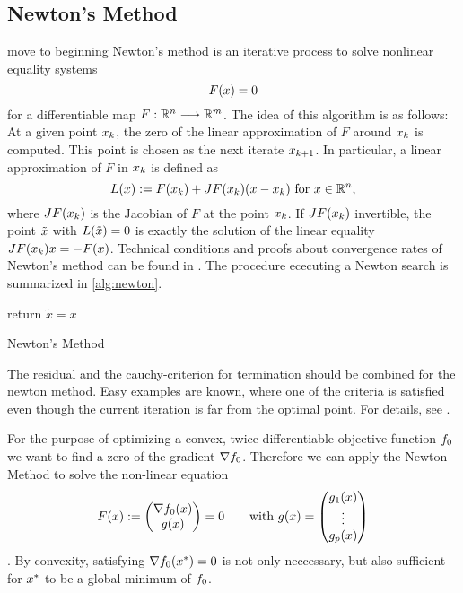 \subsection{Newton's Method}
\todo move to beginning
Newton's method is an iterative process to solve nonlinear equality systems
\begin{equation}
F(x)= 0
\end{equation}
for a differentiable map $ F: \mathbb{R}^n \longrightarrow \mathbb{R}^m $. The idea of this algorithm is as follows: At a given point $ x_k $, the zero of the linear approximation of $ F $ around $ x_k $  is computed. This point is chosen as the next iterate $ x_{k+1} $. In particular, a linear approximation of $ F $ in  $ x_k $ is defined as
\begin{equation}
	L(x):= F(x_k) + J F (x_k)(x - x_k) \text{ for } x\in \mathbb{R}^n,
\end{equation}
where $ J F (x_k) $ is the Jacobian of $ F $ at the point $ x_k $. If $ J F (x_k) $ invertible, the point $ \tilde{x} $ with $ L(\tilde{x})=0 $ is exactly the solution of  the linear equality $ J F (x_k) x = -F(x) $.
Technical conditions and proofs about convergence rates of Newton's method can be found in \cite{SO}.
The procedure ececuting a Newton search is summarized in \eqref{alg:newton}.
\begin{algorithm}
	\SetAlgoLined
	return $ \tilde{x} = x $\;
	\caption{Newton's Method}
	\label{alg:newton}
\end{algorithm}

\begin{remark}
	The residual and the cauchy-criterion for termination should be combined for the newton method. Easy examples are known, where one of the criteria is satisfied even though the current iteration is far from the optimal point. For details, see \cite{SO}.
\end{remark}

For the purpose of optimizing a convex, twice differentiable objective function $ f_0 $ we want to find a zero of the gradient $ \nabla f_0 $. Therefore we can apply the Newton Method to solve the non-linear equation \[ F(x) := \begin{pmatrix} {\nabla f_0(x)} \\ {g(x)} \end{pmatrix} = 0 \qquad \text{with }  g(x) = \begin{pmatrix} {g_1(x)} \\ {\vdots} \\ {g_p(x)} \end{pmatrix} \]. By convexity, satisfying $ \nabla f_0 (x^*) = 0$ is not only neccessary, but also sufficient for $ x^* $ to be a global minimum of $ f_0 $.\\




